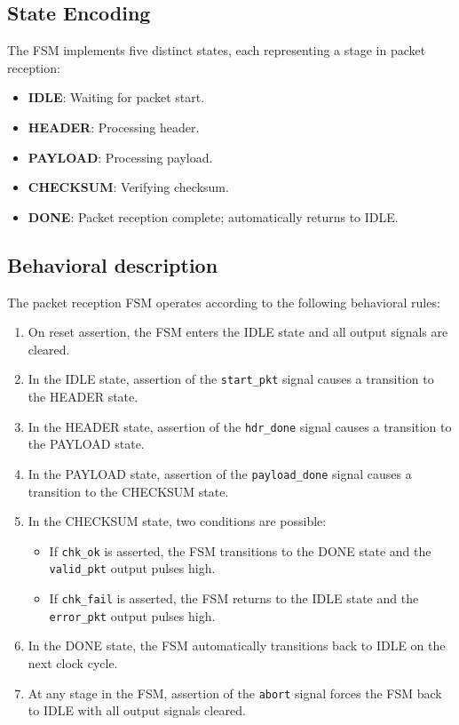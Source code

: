 \documentclass{article}
\begin{document}
\subsection{State Encoding}

The FSM implements five distinct states, each representing a stage in packet reception:
\begin{itemize}
    \item \textbf{IDLE}: Waiting for packet start.
    \item \textbf{HEADER}: Processing header.
    \item \textbf{PAYLOAD}: Processing payload.
    \item \textbf{CHECKSUM}: Verifying checksum.
    \item \textbf{DONE}: Packet reception complete; automatically returns to IDLE.
\end{itemize}

\subsection{Behavioral description}

The packet reception FSM operates according to the following behavioral rules:

\begin{enumerate}
    \item On reset assertion, the FSM enters the IDLE state and all output signals are cleared.
    
    \item In the IDLE state, assertion of the \texttt{start\_pkt} signal causes a transition to the HEADER state.
    
    \item In the HEADER state, assertion of the \texttt{hdr\_done} signal causes a transition to the PAYLOAD state.
    
    \item In the PAYLOAD state, assertion of the \texttt{payload\_done} signal causes a transition to the CHECKSUM state.
    
    \item In the CHECKSUM state, two conditions are possible:
    \begin{itemize}
        \item If \texttt{chk\_ok} is asserted, the FSM transitions to the DONE state and the \texttt{valid\_pkt} output pulses high.
        \item If \texttt{chk\_fail} is asserted, the FSM returns to the IDLE state and the \texttt{error\_pkt} output pulses high.
    \end{itemize}
    
    \item In the DONE state, the FSM automatically transitions back to IDLE on the next clock cycle.
    
    \item At any stage in the FSM, assertion of the \texttt{abort} signal forces the FSM back to IDLE with all output signals cleared.
\end{enumerate}
\end{document}
